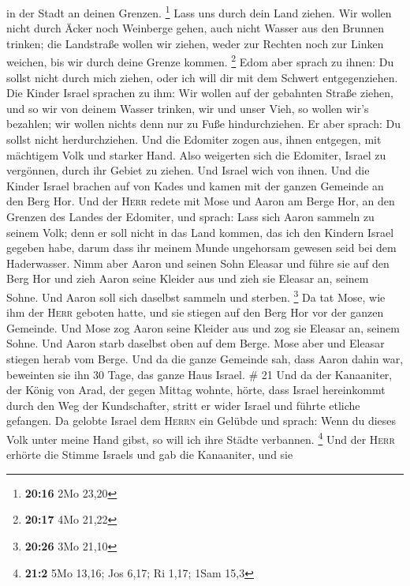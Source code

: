 in der Stadt an deinen Grenzen. \footnote{\textbf{20:16} 2Mo 23,20}
 Lass uns durch dein Land ziehen. Wir wollen nicht durch
Äcker noch Weinberge gehen, auch nicht Wasser aus den Brunnen trinken;
die Landstraße wollen wir ziehen, weder zur Rechten noch zur Linken
weichen, bis wir durch deine Grenze kommen. \footnote{\textbf{20:17} 4Mo
  21,22}  Edom aber sprach zu ihnen: Du sollst nicht
durch mich ziehen, oder ich will dir mit dem Schwert entgegenziehen.
 Die Kinder Israel sprachen zu ihm: Wir wollen auf der
gebahnten Straße ziehen, und so wir von deinem Wasser trinken, wir und
unser Vieh, so wollen wir's bezahlen; wir wollen nichts denn nur zu Fuße
hindurchziehen.  Er aber sprach: Du sollst nicht
herdurchziehen. Und die Edomiter zogen aus, ihnen entgegen, mit
mächtigem Volk und starker Hand.  Also weigerten sich die
Edomiter, Israel zu vergönnen, durch ihr Gebiet zu ziehen. Und Israel
wich von ihnen.  Und die Kinder Israel brachen auf von
Kades und kamen mit der ganzen Gemeinde an den Berg Hor. 
Und der \textsc{Herr} redete mit Mose und Aaron am Berge Hor, an den
Grenzen des Landes der Edomiter, und sprach:  Lass sich
Aaron sammeln zu seinem Volk; denn er soll nicht in das Land kommen, das
ich den Kindern Israel gegeben habe, darum dass ihr meinem Munde
ungehorsam gewesen seid bei dem Haderwasser.  Nimm aber
Aaron und seinen Sohn Eleasar und führe sie auf den Berg Hor
 und zieh Aaron seine Kleider aus und zieh sie Eleasar
an, seinem Sohne. Und Aaron soll sich daselbst sammeln und sterben.
\footnote{\textbf{20:26} 3Mo 21,10}  Da tat Mose, wie ihm
der \textsc{Herr} geboten hatte, und sie stiegen auf den Berg Hor vor
der ganzen Gemeinde.  Und Mose zog Aaron seine Kleider
aus und zog sie Eleasar an, seinem Sohne. Und Aaron starb daselbst oben
auf dem Berge. Mose aber und Eleasar stiegen herab vom Berge.
 Und da die ganze Gemeinde sah, dass Aaron dahin war,
beweinten sie ihn 30 Tage, das ganze Haus Israel. \# 21 
Und da der Kanaaniter, der König von Arad, der gegen Mittag wohnte,
hörte, dass Israel hereinkommt durch den Weg der Kundschafter, stritt er
wider Israel und führte etliche gefangen.  Da gelobte
Israel dem \textsc{Herrn} ein Gelübde und sprach: Wenn du dieses Volk
unter meine Hand gibst, so will ich ihre Städte verbannen. \footnote{\textbf{21:2}
  5Mo 13,16; Jos 6,17; Ri 1,17; 1Sam 15,3}  Und der
\textsc{Herr} erhörte die Stimme Israels und gab die Kanaaniter, und sie
